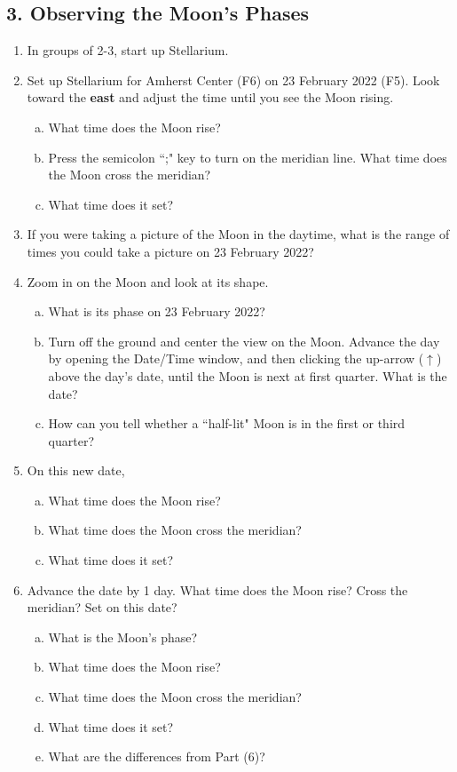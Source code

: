 \documentclass[main.tex]{subfiles}
\begin{document}
\subsection*{3. Observing the Moon's Phases}
\begin{enumerate}
\item In groups of 2-3, start up Stellarium.

\item Set up Stellarium for Amherst Center (F6) on 23 February 2022 (F5). Look toward the \textbf{east} and adjust the time until you see the Moon rising.
	\begin{enumerate}[a.]
	\item What time does the Moon rise?
	\item Press the semicolon ``;" key to turn on the meridian line. What time does the Moon cross the meridian?
	\item What time does it set?
	\end{enumerate}

\item If you were taking a picture of the Moon in the daytime, what is the range of times you could take a picture on 23 February 2022?

\item Zoom in on the Moon and look at its shape. 
	\begin{enumerate}[a.]
	\item What is its phase on 23 February 2022?
	\item Turn off the ground and center the view on the Moon. Advance the day by opening the Date/Time window, and then clicking the up-arrow ($\uparrow$) above the day's date, until the Moon is next at first quarter. What is the date?
	\item How can you tell whether a ``half-lit" Moon is in the first or third quarter?
	\end{enumerate}

\item On this new date,
	\begin{enumerate}[a.]
	\item What time does the Moon rise?
	\item What time does the Moon cross the meridian?
	\item What time does it set?
	\end{enumerate}

\item Advance the date by 1 day. What time does the Moon rise? Cross the meridian? Set on this date?
	\begin{enumerate}[a.]
	\item What is the Moon's phase?
	\item What time does the Moon rise?
	\item What time does the Moon cross the meridian?
	\item What time does it set?
	\item What are the differences from Part (6)?
	\end{enumerate}


\end{enumerate}
\end{document}
